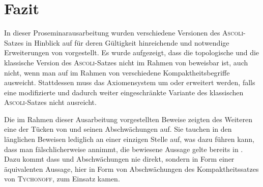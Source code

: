 \chapter{Fazit}

In dieser Proseminarausarbeitung wurden verschiedene Versionen des \textsc{Ascoli}-Satzes in Hinblick auf für deren Gültigkeit hinreichende und notwendige Erweiterungen von \ZF vorgestellt.
Es wurde aufgezeigt, dass die topologische und die klassische Version des \textsc{Ascoli}-Satzes nicht im Rahmen von \ZF beweisbar ist, auch nicht, wenn man auf im Rahmen von \ZF verschiedene Kompaktheitsbegriffe ausweicht.
Stattdessen muss das Axiomensystem um \PIT oder \CCR erweitert werden, falls eine modifizierte und dadurch weiter eingeschränkte Variante des klassischen \textsc{Ascoli}-Satzes nicht ausreicht.

Die im Rahmen dieser Ausarbeitung vorgestellten Beweise zeigten des Weiteren eine der Tücken von \AC und seinen Abschwächungen auf. Sie tauchen in den länglichen Beweisen lediglich an einer einzigen Stelle auf, was dazu führen kann, dass man fälschlicherweise annimmt, die bewiesene Aussage gelte bereits in \ZF. Dazu kommt dass \AC und Abschwächungen nie direkt, sondern in Form einer äquivalenten Aussage, hier in Form von Abschwächungen des Kompaktheitssatzes von \textsc{Tychonoff}, zum Einsatz kamen.
